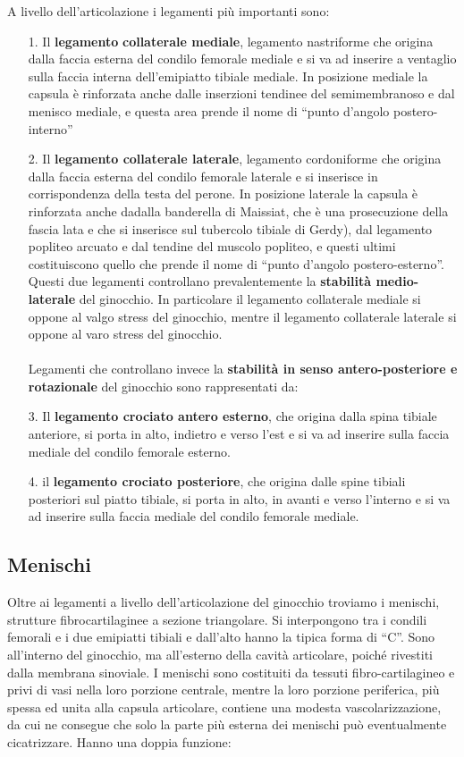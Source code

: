 A livello dell'articolazione i legamenti più importanti sono:
\begin{itemize}
\item[1.] Il \textbf{legamento} \textbf{collaterale mediale}, legamento nastriforme che origina dalla faccia esterna del condilo femorale mediale e si va ad inserire a ventaglio sulla faccia interna dell'emipiatto tibiale mediale. In posizione mediale la capsula è rinforzata anche dalle inserzioni tendinee del semimembranoso e dal
menisco mediale, e questa area prende il nome di ``punto d'angolo postero-interno''
\item[2.] Il \textbf{legamento collaterale laterale}, legamento cordoniforme che origina dalla faccia esterna del condilo femorale laterale e si inserisce in corrispondenza della testa del perone. In posizione
laterale la capsula è rinforzata anche dadalla banderella di Maissiat, che è una prosecuzione della fascia lata e che si inserisce sul tubercolo tibiale di Gerdy), dal legamento popliteo arcuato e dal tendine del muscolo popliteo, e questi ultimi costituiscono quello che prende il nome di ``punto d'angolo postero-esterno''.
Questi due legamenti controllano prevalentemente la \textbf{stabilità medio-laterale} del ginocchio.
In particolare il legamento collaterale mediale si oppone al valgo stress del ginocchio, mentre il legamento collaterale laterale si oppone al varo stress del ginocchio.
\\\\
Legamenti che controllano invece la \textbf{stabilità in senso antero-posteriore e rotazionale} del ginocchio sono rappresentati da:
\item[3.] Il \textbf{legamento crociato antero esterno}, che origina dalla spina tibiale anteriore, si porta in alto, indietro e verso l'est e si va ad inserire sulla faccia mediale del condilo femorale esterno.
\item[4.] il \textbf{legamento crociato posteriore}, che origina dalle spine tibiali posteriori sul piatto tibiale, si porta in alto, in avanti e verso l'interno e si va ad inserire sulla faccia mediale del condilo femorale mediale.
\end{itemize}

\subsection{Menischi}

Oltre ai legamenti a livello dell'articolazione del ginocchio troviamo i menischi, strutture fibrocartilaginee a sezione triangolare. Si interpongono tra i condili femorali e i due emipiatti tibiali e dall'alto hanno la tipica forma di ``C''. Sono all'interno del ginocchio, ma all'esterno della cavità articolare, poiché rivestiti dalla membrana sinoviale. I menischi sono costituiti da tessuti fibro-cartilagineo e privi di vasi nella loro porzione centrale, mentre la loro porzione periferica, più spessa ed unita alla capsula articolare, contiene una modesta vascolarizzazione, da cui ne consegue che solo la parte più esterna dei menischi può eventualmente cicatrizzare.
Hanno una doppia funzione:

